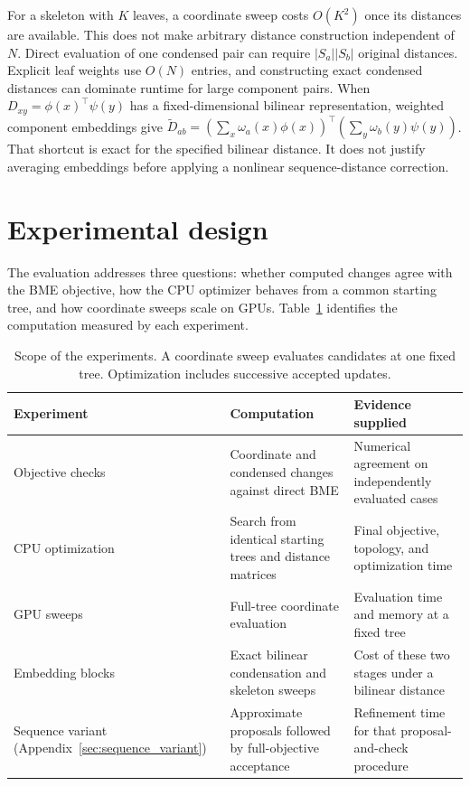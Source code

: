 \documentclass[11pt,a4paper]{article}
\makeatletter
\DeclareRobustCommand{\_}{\ifmmode\nfss@text{\textunderscore}\else\textunderscore\allowbreak\fi}
\theoremstyle{definition}
\makeatother
\begin{document}
For a skeleton with $K$ leaves, a coordinate sweep costs $O(K^2)$ once its distances are available.
This does not make arbitrary distance construction independent of $N$.
Direct evaluation of one condensed pair can require $|S_a||S_b|$ original distances.
Explicit leaf weights use $O(N)$ entries, and constructing exact condensed distances can dominate runtime for large component pairs.
When $D_{xy}=\phi(x)^\top\psi(y)$ has a fixed-dimensional bilinear representation, weighted component embeddings give
$\widetilde D_{ab}=(\sum_x\omega_a(x)\phi(x))^\top
(\sum_y\omega_b(y)\psi(y))$.
That shortcut is exact for the specified bilinear distance.
It does not justify averaging embeddings before applying a nonlinear sequence-distance correction.

\section{Experimental design}
\label{sec:experiments}

The evaluation addresses three questions: whether computed changes agree with the BME objective, how the CPU optimizer behaves from a common starting tree, and how coordinate sweeps scale on GPUs.
Table~\ref{tab:experiment_scope} identifies the computation measured by each experiment.

\begin{table}[!htbp]
\centering\small
\caption{Scope of the experiments. A coordinate sweep evaluates candidates at one fixed tree. Optimization includes successive accepted updates.}
\label{tab:experiment_scope}
\begin{tabular}{@{}>{\raggedright\arraybackslash}p{.23\linewidth}>{\raggedright\arraybackslash}p{.36\linewidth}>{\raggedright\arraybackslash}p{.35\linewidth}@{}}
\toprule
Experiment & Computation & Evidence supplied\\
\midrule
Objective checks & Coordinate and condensed changes against direct BME & Numerical agreement on independently evaluated cases\\[3pt]
CPU optimization & Search from identical starting trees and distance matrices & Final objective, topology, and optimization time\\[3pt]
GPU sweeps & Full-tree coordinate evaluation & Evaluation time and memory at a fixed tree\\[3pt]
Embedding blocks & Exact bilinear condensation and skeleton sweeps & Cost of these two stages under a bilinear distance\\[3pt]
Sequence variant (Appendix~\ref{sec:sequence_variant}) & Approximate proposals followed by full-objective acceptance & Refinement time for that proposal-and-check procedure\\
\bottomrule
\end{tabular}
\end{table}
\end{document}
